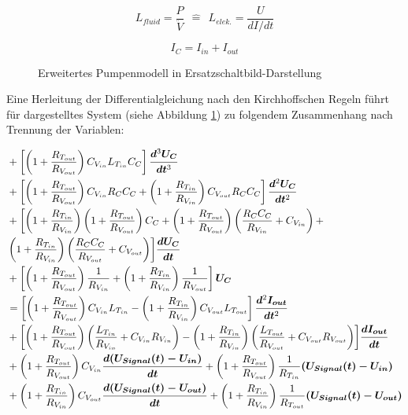 \documentclass[fontsize=12pt, a4paper]{scrartcl}
\begin{document}
\begin{equation}
	L_{fluid} = \frac{P}{\ddot{V}} \:\:\widehat{=}\:\: L_{elek.} = \frac{U}{dI/dt}
\end{equation}

\begin{equation}
	I_{C} = I_{in} + I_{out}
\end{equation}

\begin{figure}[H]
	
	\caption{Erweitertes Pumpenmodell in Ersatzschaltbild-Darstellung}
	\label{outlookcircuit}
\end{figure}

Eine Herleitung der Differentialgleichung nach den Kirchhoffschen Regeln führt für dargestelltes System (siehe Abbildung \ref{outlookcircuit}) zu folgendem Zusammenhang nach Trennung der Variablen:

\begin{equation}
	\begin{split}
		&+ \left[\left(1+\frac{R_{T_{out}}}{R_{V_{out}}}\right)C_{V_{in}}L_{T_{in}}C_{C}\right]\bm{\frac{d\textsuperscript{3}U_{C}}{dt\textsuperscript{3}}} \\
		&+ \left[\left(1+\frac{R_{T_{out}}}{R_{V_{out}}}\right)C_{V_{in}}R_{C}C_{C} + \left(1+\frac{R_{T_{in}}}{R_{V_{in}}}\right)C_{V_{out}}R_{C}C_{C}\right]\bm{\frac{d\textsuperscript{2}U_{C}}{dt\textsuperscript{2}}} \\
		&+ \biggl[\left(1+\frac{R_{T_{in}}}{R_{V_{in}}}\right)\left(1+\frac{R_{T_{out}}}{R_{V_{out}}}\right)C_{C} + \left(1+\frac{R_{T_{out}}}{R_{V_{out}}}\right)\left(\frac{R_{C}C_{C}}{R_{V_{in}}}+C_{V_{in}}\right) + \\
		& \left(1+\frac{R_{T_{in}}}{R_{V_{in}}}\right)\left(\frac{R_{C}C_{C}}{R_{V_{out}}}+C_{V_{out}}\right)\biggr] \bm{\frac{dU_{C}}{dt}}  \\
		&+ \left[\left(1+\frac{R_{T_{out}}}{R_{V_{out}}}\right)\frac{1}{R_{V_{in}}} + \left(1+\frac{R_{T_{in}}}{R_{V_{in}}}\right)\frac{1}{R_{V_{out}}}\right]\bm{U_{C}} \\
		&= \left[\left(1+\frac{R_{T_{out}}}{R_{V_{out}}}\right)C_{V_{in}}L_{T_{in}} - \left(1+\frac{R_{T_{in}}}{R_{V_{in}}}\right)C_{V_{out}}L_{T_{out}}\right]\bm{\frac{d\textsuperscript{2}I_{out}}{dt\textsuperscript{2}}} \\
		&+ \biggl[\left(1+\frac{R_{T_{out}}}{R_{V_{out}}}\right)\left(\frac{L_{T_{in}}}{R_{V_{in}}}+C_{V_{in}}R_{V_{in}}\right) - \left(1+\frac{R_{T_{in}}}{R_{V_{in}}}\right)\left(\frac{L_{T_{out}}}{R_{V_{out}}}+C_{V_{out}}R_{V_{out}}\right)\biggr]\bm{\frac{dI_{out}}{dt}} \\
		&+ \left(1+\frac{R_{T_{out}}}{R_{V_{out}}}\right)C_{V_{in}}\bm{\frac{d(U_{Signal}(t) - U_{in})}{dt}} + \left(1+\frac{R_{T_{out}}}{R_{V_{out}}}\right)\frac{1}{R_{T_{in}}}\bm{(U_{Signal}(t) - U_{in})} \\
		&+ \left(1+\frac{R_{T_{in}}}{R_{V_{in}}}\right)C_{V_{out}}\bm{\frac{d(U_{Signal}(t) - U_{out})}{dt}} + \left(1+\frac{R_{T_{in}}}{R_{V_{in}}}\right)\frac{1}{R_{T_{out}}}\bm{(U_{Signal}(t) - U_{out})}
	\end{split}
\end{equation}
\end{document}

